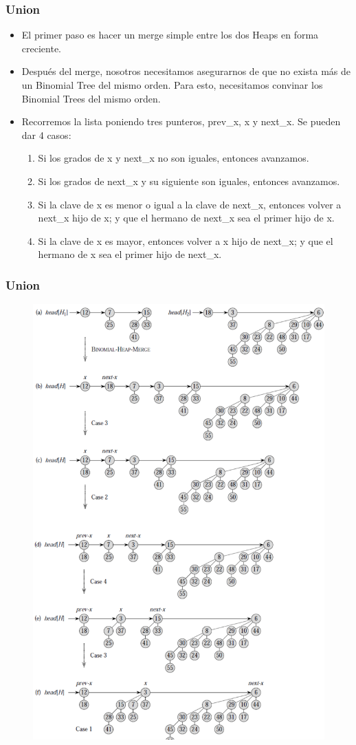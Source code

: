 \documentclass{beamer}
\begin{document}
\begin{frame}
 \frametitle{Union}
 \begin{itemize}
  \item El primer paso es hacer un merge simple entre los dos Heaps
	en forma creciente.
  \item Después del merge, nosotros necesitamos asegurarnos de que no exista
	más de un Binomial Tree del mismo orden. Para esto, necesitamos convinar
	los Binomial Trees del mismo orden.
  \item Recorremos la lista poniendo tres punteros, prev\_x, x y next\_x. Se pueden dar 4 casos:
  \begin{enumerate}
   \item Si los grados de x y next\_x no son iguales, entonces avanzamos.
   \item Si los grados de next\_x y su siguiente son iguales, entonces avanzamos.
   \item Si la clave de x es menor o igual a la clave de next\_x, entonces volver a next\_x hijo de x; y que el hermano de next\_x sea el primer hijo de x.
   \item Si la clave de x es mayor, entonces volver a x hijo de next\_x; y que el hermano de x sea el primer hijo de next\_x.
  \end{enumerate}
 \end{itemize}
\end{frame}

\begin{frame}
 \frametitle{Union}
 \begin{figure}
  \centering
  \includegraphics[scale = 0.23]{4.pdf}
 \end{figure}
\end{frame}
\end{document}
